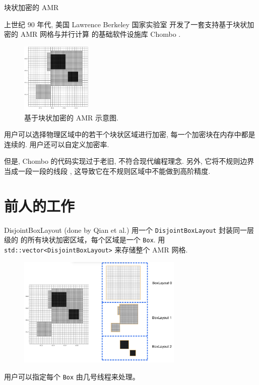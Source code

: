 \documentclass[10pt]{beamer}
\begin{document}
\begin{frame}[fragile]{块状加密的 AMR}
    \footnotesize

    上世纪 90 年代, 美国 Lawrence Berkeley 国家实验室
    开发了一套支持基于块状加密的 AMR 网格与并行计算
    的基础软件设施库 Chombo  . 

    \begin{figure}[H]
        \centering
        \includegraphics[width=0.3\textwidth]{png/blockAMR.png}
        \caption{\footnotesize 基于块状加密的 AMR 示意图.}
    \end{figure}

    \vspace{-1.2em}
    用户可以选择物理区域中的若干个块状区域进行加密,
    每一个加密块在内存中都是连续的.
    用户还可以自定义加密率.

    \pause
    但是, Chombo 的代码实现过于老旧, 
    不符合现代编程理念.
    另外, 它将不规则边界当成一段一段的线段 ,
    这导致它在不规则区域中不能做到高阶精度.
\end{frame}

\section{前人的工作}

\begin{frame}[fragile]{DisjointBoxLayout (done by Qian et al.)}
    \footnotesize
    用一个 \verb|DisjointBoxLayout| 封装同一层级的
    的所有块状加密区域，每个区域是一个 \verb|Box|.
    用 \verb|std::vector<DisjointBoxLayout>| 来存储整个 AMR 网格.

    \begin{figure}[H]
        \centering
        \includegraphics[width=0.7\textwidth]{jpg/BoxLayout.jpeg}
    \end{figure}

    用户可以指定每个 \verb|Box| 由几号线程来处理。
\end{frame}
\end{document}
